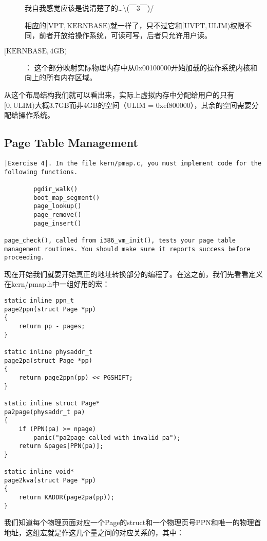 \documentclass{article}
\begin{document}
\begin{CJK*}{UTF8}{gkai}
\begin{description}
我自我感觉应该是说清楚了的\ldots \textbackslash (￣3￣)/

相应的$[\mathrm{VPT},\mathrm{KERNBASE})$就一样了，只不过它和$[\mathrm{UVPT},\mathrm{ULIM})$权限不同，前者开放给操作系统，可读可写，后者只允许用户读。

\item[$[\mathrm{KERNBASE},\mathrm{4GB})$] ：\newline
这个部分映射实际物理内存中从0x00100000开始加载的操作系统内核和向上的所有内存区域。
\end{description}

从这个布局结构我们就可以看出来，实际上虚拟内存中分配给用户的只有$[0,\mathrm{ULIM})$大概3.7GB而非4GB的空间（ULIM = 0xef800000），其余的空间需要分配给操作系统。


\subsection{Page Table Management}
\begin{lstlisting}[style=exercise]
|Exercise 4|. In the file kern/pmap.c, you must implement code for the following functions.

        pgdir_walk()
        boot_map_segment()
        page_lookup()
        page_remove()
        page_insert()
	
page_check(), called from i386_vm_init(), tests your page table management routines. You should make sure it reports success before proceeding.
\end{lstlisting}

现在开始我们就要开始真正的地址转换部分的编程了。在这之前，我们先看看定义在kern/pmap.h中一组好用的宏：

\begin{lstlisting}[style=ccode, firstnumber=63, title={\scriptsize \ttfamily \bfseries kern/pmap.h}]
static inline ppn_t
page2ppn(struct Page *pp)
{
	return pp - pages;
}

static inline physaddr_t
page2pa(struct Page *pp)
{
	return page2ppn(pp) << PGSHIFT;
}

static inline struct Page*
pa2page(physaddr_t pa)
{
	if (PPN(pa) >= npage)
		panic("pa2page called with invalid pa");
	return &pages[PPN(pa)];
}

static inline void*
page2kva(struct Page *pp)
{
	return KADDR(page2pa(pp));
}
\end{lstlisting}

我们知道每个物理页面对应一个Page的struct和一个物理页号PPN和唯一的物理首地址，这组宏就是作这几个量之间的对应关系的，其中：


\end{CJK*}
\end{document}
